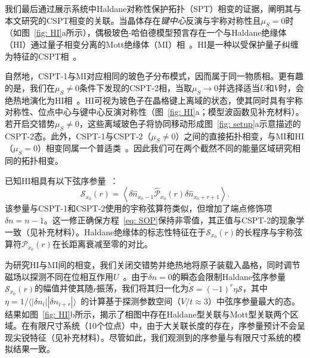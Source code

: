 \documentclass[preprint,superscriptaddress,floatfix, nofootinbib]{revtex4-2}
\begin{document}
我们最后通过展示系统中Haldane对称性保护拓扑（SPT）相变的证据，阐明其与本文研究的CSPT相变的关联。当晶体存在\textit{键中心}反演与宇称对称性且$\mu_S = 0$时（如图~\ref{fig: HI}a所示），偶极玻色-哈伯德模型预言存在一个与Haldane绝缘体（HI）通过量子相变分离的Mott绝缘体（MI）相~\cite{Haldane1983, Buyers1986, Xu1996, Torre2006}。HI是一种以受保护量子纠缠为特征的CSPT相~\cite{Pollmann2012}。

自然地，CSPT-1与MI对应相同的玻色子分布模式，因而属于同一物质相。更有趣的是，我们在$\mu_S \neq 0$条件下发现的CSPT-2相，当取$\mu_S \to 0$并选择适当$U$和$V$时，会绝热地演化为HI相~\cite{Fuji2015}。HI可视为玻色子在晶格键上离域的状态，使其同时具有宇称对称性、位点中心与键中心反演对称性（图~\ref{fig: HI}a；模型波函数见补充材料）。若开启交错势$\mu_S \neq 0$，这些离域玻色子将协同移动形成图~\ref{fig: setup}a示意描述的CSPT-2态。此外，CSPT-1与CSPT-2（$\mu_S \neq 0$）之间的直接拓扑相变，与MI和HI（$\mu_S = 0$）相变同属一个普适类~\cite{Sahay2025}。因此我们可在两个截然不同的能量区域研究相同的拓扑相变。

已知HI相具有以下弦序参量~\cite{Nijs1989, Pollmann2012Detection}：
\begin{equation}
\label{eq: SOP}
\mathcal{S}_{x_0} (r)=\left\langle\delta \hat n_{x_0 -1} \hat{\mathcal{P}}_{x_0}(r)\delta \hat n_{x_0+r + 1}\right\rangle.
\end{equation}
该参量与CSPT-1和CSPT-2使用的宇称弦算符类似，但增加了端点修饰项$\delta n = n - 1$。这一修正确保方程~\eqref{eq: SOP}保持非零值，其正值与CSPT-2的现象学一致（见补充材料）。Haldane绝缘体的标志性特征在于$\mathcal{S}_{x_0}(r)$的长程序与宇称弦算符$\mathcal{P}_{x_0}(r)$在长距离衰减至零的对比。

为研究HI与MI间的相变，我们关闭交错势并绝热地将原子装载入晶格，同时调节磁场以探测不同在位相互作用$U$~\cite{Patscheider2022}。由于$\delta n = 0$的瞬态会限制Haldane弦序参量$\mathcal{S}_{x_0}(r)$的幅值并使其随$r$振荡，我们将其归一化为$\widetilde{\mathcal{S}} = (-1)^{r}\eta \mathcal{S}$，其中$\eta=1/\langle |\delta n_i||\delta n_{i+r}|\rangle$~\cite{Sompet2022}的计算基于探测参数空间（$V/t \approx 3$）中弦序参量最大的态。结果如图~\ref{fig: HI}b所示，揭示了相图中存在Haldane型关联与Mott型关联两个区域。在有限尺寸系统（10个位点）中，由于大关联长度的存在，序参量预计不会呈现尖锐特征（见补充材料）。尽管如此，我们观测到的序参量与有限尺寸系统的模拟结果一致。
\end{document}
